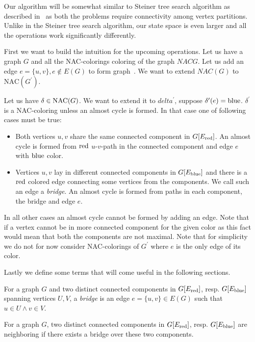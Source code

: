 Our algorithm will be somewhat similar to Steiner tree search algorithm
as described in~\cite{book_parametrized_algorithms} as both the problems require connectivity
among vertex partitions. Unlike in the Steiner tree search algorithm,
our state space is even larger and all the operations work significantly differently.

First we want to build the intuition for the upcoming operations.
Let us have a graph \( G \) and all the NAC-colorings coloring of the graph
\( NACG \). Let us add an edge \( e = \{u, v\}, e \not\in E(G) \) to form graph~\Gprime.
We want to extend \( NAC(G) \) to \( \text{NAC} (G^\prime) \).

Let us have \( \delta \in \text{NAC} (G) \).
We want to extend it to \( delta^\prime \), suppose \( \delta^\prime(e) = \text{blue} \).
\( \delta^\prime \) is a NAC-coloring unless an almost cycle is formed.
In that case one of following cases must be true:
%
\begin{itemize}
	\item Both vertices \( u, v \) share the same connected component in \( G[E_\text{red}] \).
	      An almost cycle is formed
	      from \( \text{red} \) \( u \)-\( v \)-path in the connected component
	      and edge \( e \) with \( \text{blue} \) color.
	\item Vertices \( u, v \) lay in different connected components in \( G[E_\text{blue}] \)
	      and there is a \( \text{red} \) colored edge connecting some vertices from the components.
	      We call such an edge a \emph{bridge}.
	      An almost cycle is formed from paths in each component, the bridge and edge \( e \).
\end{itemize}
%
In all other cases an almost cycle cannot be formed by adding an edge.
Note that if a vertex cannot be in more connected component for the given color
as this fact would mean that both the components are not maximal.
Note that for simplicity we do not for now consider
NAC-colorings of \( G^\prime \)
where \( e \) is the only edge of its color.

Lastly we define some terms that will come useful in the following sections.
%
\begin{definition}[Bridge]
	For a graph \( G \) and two distinct connected components
	in \( G[E_\text{red}] \), resp. \( G[E_\text{blue}] \)
	spanning vertices \( U, V \),
	a \emph{bridge} is an edge \( e = \{u, v\} \in E(G) \) such that \( u \in U \land v \in V \).
\end{definition}
%
%
\begin{definition}
	For a graph \( G \), two distinct connected components
	in \( G[E_\text{red}] \), resp. \( G[E_\text{blue}] \)
	are neighboring if there exists a bridge over these two components.
\end{definition}
%

